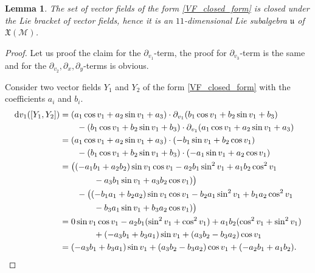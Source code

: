 \documentclass{amsart}
\theoremstyle{plain}
\newtheorem{lemma}[theorem]{Lemma}
\theoremstyle{definition}
\theoremstyle{remark}
\newcommand{\mc}[1]{\mathcal{#1}}
\newcommand{\mfk}[1]{\mathfrak{#1}}
\newcommand{\di}{\mathrm{d}}
\begin{document}
\begin{lemma} \label{lemma:Lie_bracket_closed}
    The set of vector fields of the form \eqref{VF_closed_form} is closed under the Lie bracket of vector fields, hence it is an $11$-dimensional Lie subalgebra $\mfk{u}$ of $\mfk{X}(\mc{M})$.
\end{lemma}
\begin{proof}
    Let us proof the claim for the $\partial_{v_1}$-term, the proof for $\partial_{v_3}$-term is the same and for the $\partial_{v_2}, \partial_{x}, \partial_{y}$-terms is obvious.

    Consider two vector fields $Y_1$ and $Y_2$ of the form \eqref{VF_closed_form} with the  coefficients $a_i$ and $b_i$.
    \begin{align*}
        \di v_1 ([Y_1,Y_2])
        &= (a_1 \cos v_1 + a_2 \sin v_1 + a_3) \cdot \partial_{v_1}(b_1 \cos v_1 + b_2 \sin v_1 + b_3)\\
        &\qquad - (b_1 \cos v_1 + b_2 \sin v_1 + b_3) \cdot \partial_{v_1}(a_1 \cos v_1 + a_2 \sin v_1 + a_3)\\
        &= (a_1 \cos v_1 + a_2 \sin v_1 + a_3) \cdot (-b_1 \sin v_1 + b_2 \cos v_1)\\
        &\qquad - (b_1 \cos v_1 + b_2 \sin v_1 + b_3) \cdot (-a_1 \sin v_1 + a_2 \cos v_1)\\
        &= \bigl( (-a_1 b_1 + a_2 b_2) \sin v_1 \cos v_1 - a_2 b_1 \sin^2 v_1 + a_1 b_2 \cos^2 v_1\\
        &\qquad\qquad - a_3 b_1 \sin v_1 + a_3 b_2 \cos v_1) \bigr) \\
        &\qquad - \bigl( (-b_1 a_1 + b_2 a_2) \sin v_1 \cos v_1 - b_2 a_1 \sin^2 v_1 + b_1 a_2 \cos^2 v_1\\
        &\qquad\qquad - b_3 a_1 \sin v_1 + b_3 a_2 \cos v_1) \bigr) \\
        &= 0 \sin v_1 \cos v_1 - a_2 b_1 (\sin^2 v_1 + \cos^2 v_1) + a_1 b_2 (\cos^2 v_1 + \sin^2 v_1)\\
        &\qquad\qquad + (-a_3 b_1 + b_3 a_1) \sin v_1 + (a_3 b_2 - b_3 a_2) \cos v_1\\
        &= (-a_3 b_1 + b_3 a_1) \sin v_1 + (a_3 b_2 - b_3 a_2) \cos v_1 + (-a_2 b_1 + a_1 b_2).
        \qedhere
    \end{align*}
\end{proof}
\end{document}
